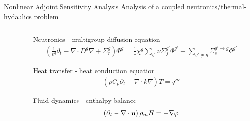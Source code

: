 
\begin{frame}{Nonlinear Adjoint Sensitivity Analysis}
  {Analysis of a coupled neutronics/thermal-hydaulics problem}

  \begin{columns}[T]
    \begin{column}{5cm}
    
  \end{column}

  \begin{column}{7cm}
    \tiny

    \begin{block}{Neutronics - multigroup diffusion equation}
      \begin{align}
        \left( \frac{1}{v^{g}} \partial_{t} 
        - \nabla \cdot D^{g} \nabla
        + \Sigma_{r}^{g} \right) \Phi^{g}
        = \frac{1}{\lambda} \chi^{g} \sum_{g'} \nu \Sigma_{f}^{g'} \Phi^{g'}
        + \sum_{g'\neq g} \Sigma_{s}^{g' \rightarrow g} \Phi^{g'}
        \nonumber 
      \end{align}
    \end{block}

    \begin{block}{Heat transfer  - heat conduction equation}
      \begin{align}
        \left( \rho C_{p} \partial_{t}
        - \nabla \cdot k \nabla \right) T 
        = q''' \nonumber
      \end{align}
    \end{block}
 
    \begin{block}{Fluid dynamics  - enthalpy balance}
      \begin{align}
        \left( \partial_{t}
        - \nabla \cdot \boldsymbol{u} \right) \rho_m H 
        = - \nabla \varphi \nonumber
      \end{align}
    \end{block}

  \end{column}
  \end{columns}

\end{frame}

